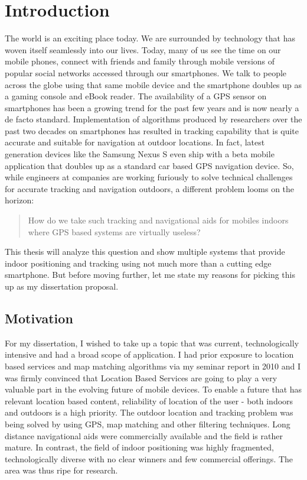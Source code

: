 \chapter{Introduction}

The world is an exciting place today. We are surrounded by technology that has
woven itself seamlessly into our lives. Today, many of us see the time on our
mobile phones, connect with friends and family through mobile versions of
popular social networks accessed through our smartphones. We talk to people
across the globe using that same mobile device and the smartphone doubles up as
a gaming console and eBook reader. The availability of a GPS sensor on 
smartphones has been a growing trend for the past few years and is now nearly
a de facto standard. Implementation of algorithms produced by researchers
over the past two decades on smartphones has resulted in tracking capability
that is quite accurate and suitable for navigation at outdoor locations. 
In fact, latest generation devices like the Samsung Nexus S even ship 
with a beta mobile application that doubles up as a standard car based GPS 
navigation device. So, while engineers at companies are working furiously 
to solve technical challenges for accurate tracking and navigation outdoors,
a different problem looms on the horizon: 

\begin{quote}
How do we take such tracking and navigational aids for mobiles indoors where GPS
based systems are virtually useless?
\end{quote}

This thesis will analyze this question and show multiple systems that 
provide indoor positioning and tracking using not much more than a
cutting edge smartphone. But before moving further, let me state my reasons
for picking this up as my dissertation proposal.


\section{Motivation}

For my dissertation, I wished to take up a topic that was current,
technologically intensive and had a broad scope of application. I had prior
exposure to location based services and map matching algorithms via my seminar
report\cite{SEMINAR} in 2010 and I was firmly convinced that Location Based
Services are going to play a very valuable part in the evolving future of mobile
devices. To enable a future that has relevant location based content, 
reliability of location of the user - both indoors and outdoors is a high 
priority. The outdoor location and tracking problem was being solved 
by using GPS, map matching and other filtering techniques. Long distance 
navigational aids were commercially available and the field is rather mature.
In contrast, the field of indoor positioning was highly fragmented, 
technologically diverse with no clear winners and few commercial offerings. 
The area was thus ripe for research.


